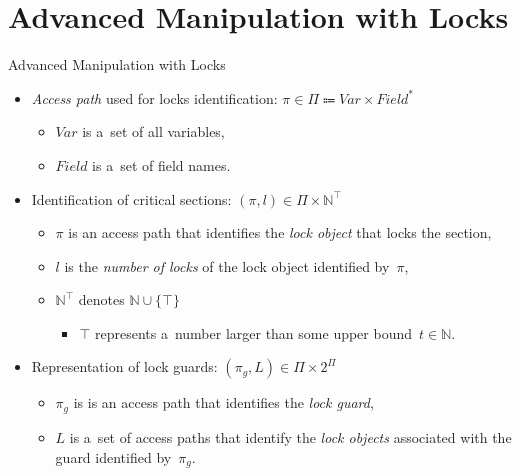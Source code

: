\documentclass[10pt, xcolor=pdflatex, hyperref={unicode}, aspectratio=169]{beamer}
\begin{document}
\section{Advanced Manipulation with Locks}
\begin{frame}{Advanced Manipulation with Locks}
    \begin{itemize}\setlength\itemsep{1.5em}
        \item \emph{Access path} used for \alert{locks identification}: $ \pi \in \Pi \Coloneqq Var \times Field^* $
            \smallskip
            \begin{itemize}\setlength\itemsep{.8em}
                \item $ Var $ is a~set of all variables,
                
                \item $ Field $ is a~set of field names.
            \end{itemize}
        
        \item Identification of \alert{critical sections}: $ (\pi, l) \in \Pi \times \mathbb{N}^\top $
            \smallskip
            \begin{itemize}\setlength\itemsep{.8em}
                \item $ \pi $ is an access path that identifies the \emph{lock object} that locks the section,
                
                \item $ l $ is the \emph{number of locks} of the lock object identified by~$ \pi $,
                
                \item $ \mathbb{N}^\top $ denotes $ \mathbb{N} \cup \{\top\} $
                    \smallskip
                    \begin{itemize}
                        \item $ \top $ represents a~number larger than some \alert{upper bound}~$ t \in \mathbb{N} $.
                    \end{itemize}
            \end{itemize}
        
        \item Representation of \alert{lock guards}: $ (\pi_g, L) \in \Pi \times 2^\Pi $
            \smallskip
            \begin{itemize}\setlength\itemsep{.8em}
                \item $ \pi_g $ is is an access path that identifies the \emph{lock guard},
                
                \item $ L $ is a~set of access paths that identify the \emph{lock objects} associated with the guard identified by~$ \pi_g $.
            \end{itemize}
    \end{itemize}
\end{frame}


\end{document}
